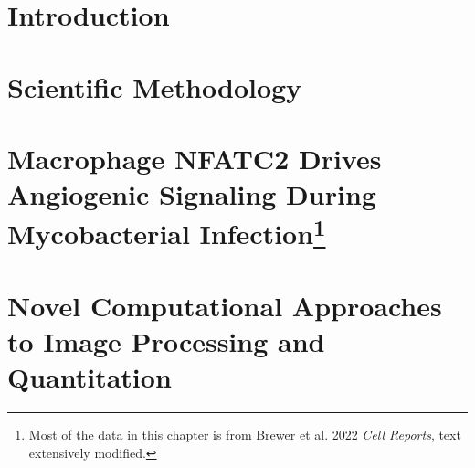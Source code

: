 \documentclass[PhD]{dukethesis2006}
\begin{document}
\tableofcontents


\chapter{Introduction}


\begin{doublespace}

\end{doublespace}

\chapter{Scientific Methodology}

\begin{doublespace}

\end{doublespace}

\chapter[Macrophage NFATC2 Drives Angiogenic Signaling During Mycobacterial Infection]{Macrophage NFATC2 Drives Angiogenic Signaling During Mycobacterial Infection\footnote{Most of the data in this chapter is from Brewer et al. 2022 \textit{Cell Reports}, text extensively modified.}}

\begin{doublespace}

\end{doublespace}

\chapter{Novel Computational Approaches to Image Processing and Quantitation}
\end{document}
